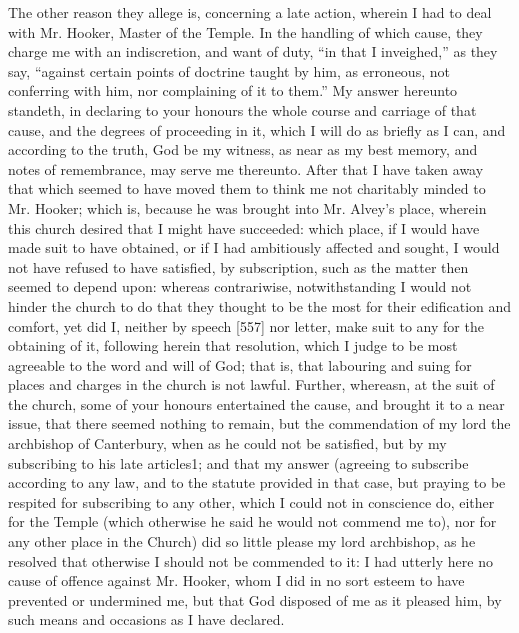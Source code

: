 The other reason they allege is, concerning a late action, wherein I had to deal with Mr. Hooker, Master of the Temple. In the handling of which cause, they charge me with an indiscretion, and want of duty, “in that I inveighed,” as they say, “against certain points of doctrine taught by him, as erroneous, not conferring with him, nor complaining of it to them.” My answer hereunto standeth, in declaring to your honours the whole course and carriage of that cause, and the degrees of proceeding in it, which I will do as briefly as I can, and according to the truth, God be my witness, as near as my best memory, and notes of remembrance, may serve me thereunto. After that I have taken away that which seemed to have moved them to think me not charitably minded to Mr. Hooker; which is, because he was brought into Mr. Alvey’s place, wherein this church desired that I might have succeeded: which place, if I would have made suit to have obtained, or if I had ambitiously affected and sought, I would not have refused to have satisfied, by subscription, such as the matter then seemed to depend upon: whereas contrariwise, notwithstanding I would not hinder the church to do that they thought to be the most for their edification and comfort, yet did I, neither by speech [557] nor letter, make suit to any for the obtaining of it, following herein that resolution, which I judge to be most agreeable to the word and will of God; that is, that labouring and suing for places and charges in the church is not lawful. Further, whereasn, at the suit of the church, some of your honours entertained the cause, and brought it to a near issue, that there seemed nothing to remain, but the commendation of my lord the archbishop of Canterbury, when as he could not be satisfied, but by my subscribing to his late articles1; and that my answer (agreeing to subscribe according to any law, and to the statute provided in that case, but praying to be respited for subscribing to any other, which I could not in conscience do, either for the Temple (which otherwise he said he would not commend me to), nor for any other place in the Church) did so little please my lord archbishop, as he resolved that otherwise I should not be commended to it: I had utterly here no cause of offence against Mr. Hooker, whom I did in no sort esteem to have prevented or undermined me, but that God disposed of me as it pleased him, by such means and occasions as I have declared.

